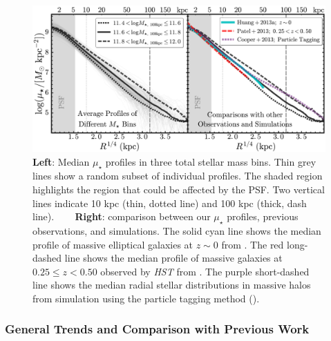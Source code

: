 \documentclass[a4paper,fleqn,usenatbib]{mnras}
\def\mden{{$\mu_{\star}$}}
\begin{document}
  \begin{figure}
      \centering 
      \includegraphics[width=\textwidth]{fig/average_mass_profiles_fsps1_A}
      \caption{
          \textbf{Left}: Median \mden{} profiles in three total stellar mass bins. 
              Thin grey lines show a random subset of individual profiles. 
              The shaded region highlights the region that could be affected by the PSF. 
              Two vertical lines indicate 10 kpc (thin, dotted line) and
              100 kpc (thick, dash line). ~~~ 
          \textbf{Right}: comparison between our \mden{} profiles, previous observations, 
              and simulations. 
              The solid cyan line shows the median profile of massive elliptical 
              galaxies at $z{\sim} 0$ from \citet[][]{Huang2013a}. 
              The red long-dashed line shows the median profile of massive galaxies at 
              $0.25 \leq z < 0.50$ observed by \textit{HST} from \citet[][]{Patel2013}. 
              The purple short-dashed line shows the median radial stellar distributions 
              in massive halos from simulation using the particle tagging method
              (\citealt{Cooper2013}).}
      \label{fig:avg_prof}
  \end{figure}


\subsubsection{General Trends and Comparison with Previous Work}
    \label{sssec:sbp_inter}
          
\end{document}
